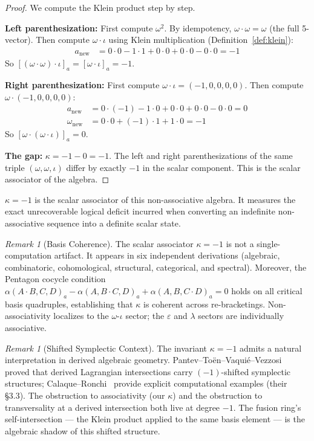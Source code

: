 \documentclass[12pt,oneside]{article}
\theoremstyle{principia}
\theoremstyle{definition}
\theoremstyle{remark}
\newtheorem{remark}[theorem]{Remark}
\providecommand{\eps}{\varepsilon}
\providecommand{\lam}{\lambda}
\providecommand{\kap}{\kappa}
\begin{document}
\begin{proof}
We compute the Klein product step by step.

\textbf{Left parenthesization:} First compute $\omega^2$. By idempotency, $\omega \cdot \omega = \omega$ (the full 5-vector). Then compute $\omega \cdot \iota$ using Klein multiplication (Definition~\ref{def:klein}):
\begin{align*}
a_{\mathrm{new}} &= 0 \cdot 0 - 1 \cdot 1 + 0 \cdot 0 + 0 \cdot 0 - 0 \cdot 0 = -1
\end{align*}
So $[(\omega \cdot \omega) \cdot \iota]_a = [\omega \cdot \iota]_a = -1$.

\textbf{Right parenthesization:} First compute $\omega \cdot \iota = (-1, 0, 0, 0, 0)$. Then compute $\omega \cdot (-1, 0, 0, 0, 0)$:
\begin{align*}
a_{\mathrm{new}} &= 0 \cdot (-1) - 1 \cdot 0 + 0 \cdot 0 + 0 \cdot 0 - 0 \cdot 0 = 0 \\
\omega_{\mathrm{new}} &= 0 \cdot 0 + (-1) \cdot 1 + 1 \cdot 0 = -1
\end{align*}
So $[\omega \cdot (\omega \cdot \iota)]_a = 0$.

\textbf{The gap:} $\kap = -1 - 0 = -1$. The left and right parenthesizations of the same triple $(\omega, \omega, \iota)$ differ by exactly $-1$ in the scalar component. This is the scalar associator of the algebra. \qedhere
\end{proof}

$\kap = -1$ is the scalar associator of this non-associative algebra. It measures the exact unrecoverable logical deficit incurred when converting an indefinite non-associative sequence into a definite scalar state.

\begin{remark}[Basis Coherence]
The scalar associator $\kap = -1$ is not a single-computation artifact. It appears in six independent derivations (algebraic, combinatoric, cohomological, structural, categorical, and spectral). Moreover, the Pentagon cocycle condition $\alpha(A{\cdot}B, C, D)_a - \alpha(A, B{\cdot}C, D)_a + \alpha(A, B, C{\cdot}D)_a = 0$ holds on all critical basis quadruples, establishing that $\kap$ is coherent across re-bracketings. Non-associativity localizes to the $\omega$-$\iota$ sector; the $\eps$ and $\lam$ sectors are individually associative.
\end{remark}

\begin{remark}[Shifted Symplectic Context]
The invariant $\kap = -1$ admits a natural interpretation in derived algebraic geometry. Pantev--To\"en--Vaqui\'e--Vezzosi~\cite{ptvv} proved that derived Lagrangian intersections carry $(-1)$-shifted symplectic structures; Calaque--Ronchi~\cite{calaque-ronchi} provide explicit computational examples (their \S3.3). The obstruction to associativity (our $\kap$) and the obstruction to transversality at a derived intersection both live at degree $-1$. The fusion ring's self-intersection --- the Klein product applied to the same basis element --- is the algebraic shadow of this shifted structure.
\end{remark}
\end{document}
